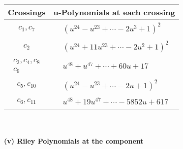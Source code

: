 \documentclass[1p]{elsarticle_modified}
\theoremstyle{definition}
\begin{document}
\begin{tabular}{m{50pt}|m{274pt}}
Crossings & \hspace{64pt}u-Polynomials at each crossing \\
\hline $$\begin{aligned}c_{1},c_{7}\end{aligned}$$&$\begin{aligned}
&(u^{24}- u^{23}+\cdots-2 u^3+1)^{2}
\end{aligned}$\\
\hline $$\begin{aligned}c_{2}\end{aligned}$$&$\begin{aligned}
&(u^{24}+11 u^{23}+\cdots-2 u^2+1)^{2}
\end{aligned}$\\
\hline $$\begin{aligned}c_{3},c_{4},c_{8}\\c_{9}\end{aligned}$$&$\begin{aligned}
&u^{48}+u^{47}+\cdots+60 u+17
\end{aligned}$\\
\hline $$\begin{aligned}c_{5},c_{10}\end{aligned}$$&$\begin{aligned}
&(u^{24}- u^{23}+\cdots-2 u+1)^{2}
\end{aligned}$\\
\hline $$\begin{aligned}c_{6},c_{11}\end{aligned}$$&$\begin{aligned}
&u^{48}+19 u^{47}+\cdots-5852 u+617
\end{aligned}$\\
\hline
\end{tabular}\\~\\
\newpage\renewcommand{\arraystretch}{1}
\flushleft \textbf{(v) Riley Polynomials at the component}\newline \\
\end{document}

